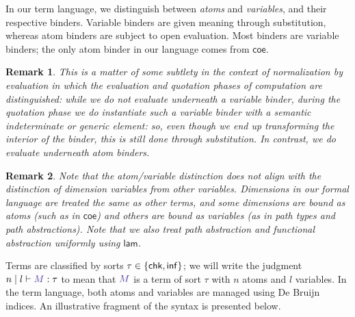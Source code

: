 \documentclass{article}
\DeclarePairedDelimiter\Parens{\lparen}{\rparen}
\DeclarePairedDelimiter\Braces{\lbrace}{\rbrace}
\newtheorem{remark}{Remark}
\newcommand\FmtKwd[1]{\mathsf{#1}}
\newcommand\FmtThin[1]{{\color{ProcessBlue}#1}}
\newcommand\FormatList[3]{%
  \xintFor ##1 in {#3} \do{%
    #1{##1}%
    \xintifForLast{}{#2}
  }
}
\newcommand\Atom[1]{{\boldsymbol\alpha}_{#1}}
\newcommand\Var[1]{\mathsf{v}_{#1}}
\newcommand\SortChk{\FmtKwd{chk}}
\newcommand\SortInf{\FmtKwd{inf}}
\newcommand\FmtTm[1]{{\color{Violet}#1}}
\newcommand\IsTm[4]{{#1}\mid{#2}\vdash\FmtTm{#3}:{#4}}
\newcommand\TExp[2]{
  \FmtTm{
    \Parens*{
      \FmtKwd{#1}\
      \FormatList{}{\ }{#2}
    }
  }
}
\begin{document}
\newcommand\TSubstA[3]{
  \TExp{subst_{\Atom{}}}{
    \FmtThin{#1}%
    \mathbin{{\color{gray}*}}%
    \FmtThin{#2},
    \FmtThin{#3}
  }
}

\newcommand\TThinV[2]{
  \TExp{thin_{\Var{}}}{
    \FmtThin{#1},
    #2
  }
}


In our term language, we distinguish between \emph{atoms} and
\emph{variables}, and their respective binders. Variable binders are
given meaning through substitution, whereas atom binders are subject
to open evaluation. Most binders are variable binders; the only atom
binder in our language comes from $\FmtKwd{coe}$.


\begin{remark}
  This is a matter of some subtlety in the context of
  \emph{normalization by evaluation} in which the evaluation and
  quotation phases of computation are distinguished: while we do not
  evaluate underneath a variable binder, during the quotation phase we
  \emph{do} instantiate such a variable binder with a semantic
  indeterminate or generic element: so, even though we end up
  transforming the interior of the binder, this is still done through
  substitution. In contrast, we do evaluate underneath atom binders.
\end{remark}

\begin{remark}
  Note that the atom/variable distinction does not align with the
  distinction of dimension variables from other variables. Dimensions
  in our formal language are treated the same as other terms, and some
  dimensions are bound as atoms (such as in $\FmtKwd{coe}$) and others
  are bound as variables (as in path types and path
  abstractions). Note that we also treat path abstraction and
  functional abstraction uniformly using $\FmtKwd{lam}$.
\end{remark}


Terms are classified by sorts $\tau\in\Braces*{\SortChk,\SortInf}$; we
will write the judgment $\IsTm{n}{l}{M}{\tau}$ to mean that
$\FmtTm{M}$ is a term of sort $\tau$ with $n$ atoms and $l$
variables. In the term language, both atoms and variables are managed
using De Bruijn indices. An illustrative fragment of the syntax is
presented below.
\end{document}
